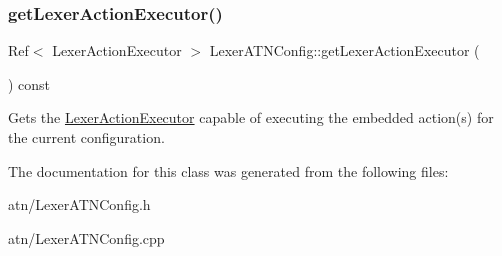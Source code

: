 \subsubsection{\texorpdfstring{get\+Lexer\+Action\+Executor()}{getLexerActionExecutor()}}
{\footnotesize\ttfamily Ref$<$ Lexer\+Action\+Executor $>$ Lexer\+A\+T\+N\+Config\+::get\+Lexer\+Action\+Executor (\begin{DoxyParamCaption}{ }\end{DoxyParamCaption}) const}

Gets the \hyperlink{}{Lexer\+Action\+Executor} capable of executing the embedded action(s) for the current configuration. 

The documentation for this class was generated from the following files\+:\begin{DoxyCompactItemize}
\item 
atn/Lexer\+A\+T\+N\+Config.\+h\item 
atn/Lexer\+A\+T\+N\+Config.\+cpp\end{DoxyCompactItemize}
